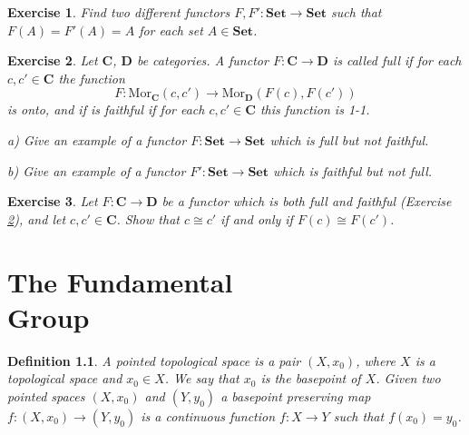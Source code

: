 \documentclass[11pt, letterpaper, oneside]{report}
\renewcommand{\chaptermark}[1]{\markboth{#1}{}}
\theoremstyle{pplain}
\theoremstyle{ddefinition}
\newtheorem{definition}[theorem]{Definition}
\theoremstyle{nnn}
\theoremstyle{eexercise}
\newtheorem{exercise}{Exercise}[chapter]
\newcommand{\Mor}{\mathrm{Mor}}
\newcommand{\CC}{{\mathbf C}}
\newcommand{\DD}{{\mathbf D}}
\newcommand{\Set}{{\mathbf{Set}}}
\begin{document}
\begin{exercise}
Find two different functors $F, F' \colon \Set \to \Set$ such that $F(A) = F'(A) = A$ for each set 
$A\in \Set$.  
\end{exercise}





\begin{exercise}
\label{FULL FAITHFUL EXERCISE}
Let $\CC$, $\DD$ be categories. A functor $F\colon \CC \to \DD$ is called \emph{full} if for each 
$c, c'\in \CC$ the function 
$$F\colon \Mor_{\CC}(c, c') \to \Mor_{\DD}(F(c), F(c'))$$
is onto, and if is \emph{faithful} if for each $c, c'\in \CC$ this function is 1-1. 

a) Give an example of a functor $F\colon \Set \to \Set$ which is full but not faithful. 

b) Give an example of a functor $F'\colon \Set \to \Set$ which is faithful but not full. 

\end{exercise}


\begin{exercise}
Let $F\colon \CC\to \DD$ be a functor which is both full and faithful (Exercise \ref{FULL FAITHFUL EXERCISE}), 
and let $c, c' \in \CC$. Show that $c\cong c'$ if and only if $F(c)\cong F(c')$. 
\end{exercise}








\newpage

\chapter[The Fundamental Group]{The Fundamental \\ Group}

\chaptermark{The Fundamental Group}
\label{FUND GP CHAPTER}

\thispagestyle{firststyle}

\begin{definition} A \emph{pointed topological space} is a pair $(X, x_{0})$, where 
$X$ is a topological space and $x_{0}\in X$. We say that $x_{0}$ is the \emph{basepoint}
of $X$. Given two pointed spaces $(X, x_{0})$ and $(Y, y_{0})$ a \emph{basepoint preserving 
map} $f\colon (X, x_{0}) \to (Y, y_{0})$ is a continuous function $f\colon X \to Y$ such that $f(x_{0}) = y_{0}$. 
\end{definition}
\end{document}

